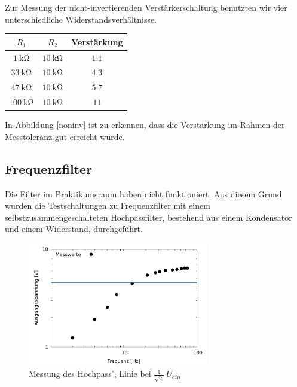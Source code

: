 Zur Messung der nicht-invertierenden Verstärkerschaltung benutzten wir vier
unterschiedliche Widerstandsverhältnisse. 
	\begin{table}[H]
		\centering
		\begin{tabular}{|c c c|}
			\hline
			$R_1$ &$R_2$ &Verstärkung \\ \hline
			$\SI{1}{\kilo \ohm}$ &$\SI{10}{\kilo\ohm}$ &$1.1$ \\
			$\SI{33}{\kilo\ohm}$ &$\SI{10}{\kilo\ohm}$ &$4.3$ \\
			$\SI{47}{\kilo\ohm}$ &$\SI{10}{\kilo\ohm}$ &$5.7$ \\
			$\SI{100}{\kilo\ohm}$ &$\SI{10}{\kilo\ohm}$ &$11$ \\
			\hline
		\end{tabular}
	\end{table}

In Abbildung \ref{noninv} ist zu erkennen, dass die Verstärkung im Rahmen der Messtoleranz
gut erreicht wurde.\\

\subsection{Frequenzfilter}
Die Filter im Praktikumsraum haben nicht funktioniert. Aus diesem Grund wurden
die Testschaltungen zu Frequenzfilter mit einem selbstzusammengeschalteten
Hochpassfilter, bestehend aus einem Kondensator und einem Widerstand,
durchgeführt. \\
\begin{figure}[htb]
	\centering
	\includegraphics[width=0.7\textwidth]{Mess/hochpass.pdf}
	\caption{Messung des Hochpass', Linie bei $\frac{1}{\sqrt{2}} \; U_{ein}$}
	\label{hochuf}
\end{figure}

